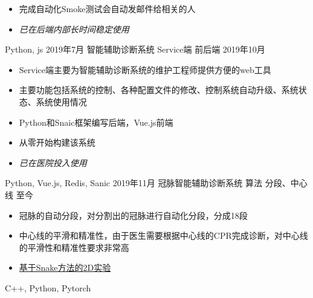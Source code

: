 \begin{experiences}
{\begin{itemize}
                        \item 完成自动化Smoke测试会自动发邮件给相关的人
                        \item \emph{已在后端内部长时间稳定使用}
                      \end{itemize}
                      \vspace{2pt}
                    }
                    {Python, js}
  \experience
    { 2019年7月 }   { 智能辅助诊断系统 }{ Service端 }{ 前后端 }
    { 2019年10月 }  {
                      \begin{itemize}
                        \item Service端主要为智能辅助诊断系统的维护工程师提供方便的web工具
                        \item 主要功能包括系统的控制、各种配置文件的修改、控制系统自动升级、系统状态、系统使用情况
                        \item Python和Snaic框架编写后端，Vue.js前端
                        \item 从零开始构建该系统
                        \item \emph{已在医院投入使用}
                      \end{itemize}
                      \vspace{2pt}
                    }
                    {Python, Vue.js, Redis, Sanic}
  \emptySeparator
  \experience
    { 2019年11月 }  { 冠脉智能辅助诊断系统 }{ 算法 }{ 分段、中心线 }
    { 至今 }  {
                      \begin{itemize}
                        \item 冠脉的自动分段，对分割出的冠脉进行自动化分段，分成18段
                        \item 中心线的平滑和精准性，由于医生需要根据中心线的CPR完成诊断，对中心线的平滑性和精准性要求非常高
                        \item \href{https://www.zybuluo.com/zsh-o/note/1659960}{\color{blue}基于Snake方法的2D实验}
                      \end{itemize}
                      \vspace{2pt}
                    }
                    {C++, Python, Pytorch}
  
\end{experiences}
